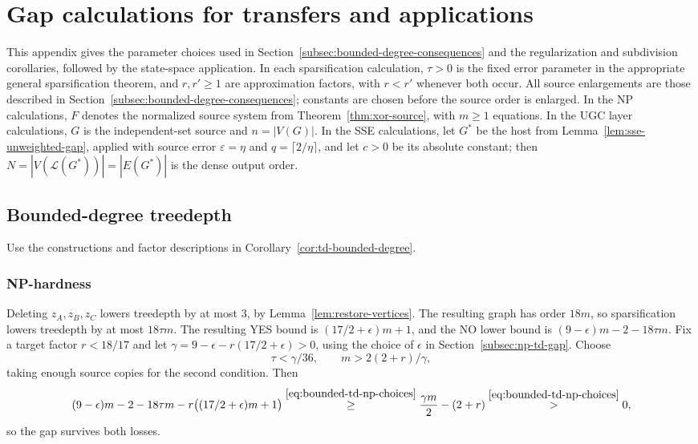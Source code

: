 \section{Gap calculations for transfers and applications}
\label{app:transfer-gap-calculations}

This appendix gives the parameter choices used in
Section~\ref{subsec:bounded-degree-consequences} and the regularization
and subdivision corollaries, followed by the state-space application.
In each sparsification calculation,
$\tau>0$ is the fixed error parameter in the appropriate general
sparsification theorem, and $r,r'\geq1$ are approximation factors,
with $r<r'$ whenever both occur. All source enlargements are those described
in Section~\ref{subsec:bounded-degree-consequences}; constants are
chosen before the source order is enlarged.
In the NP calculations, $F$ denotes the normalized source system from
Theorem~\ref{thm:xor-source}, with $m\geq1$ equations. In the UGC
layer calculations, $G$ is the independent-set source and $n=|V(G)|$.
In the SSE calculations, let $G^*$ be the host from
Lemma~\ref{lem:sse-unweighted-gap}, applied with source error
$\varepsilon=\eta$ and $q=\lceil2/\eta\rceil$, and let $c>0$ be its
absolute constant; then
$N=|V(\mathcal L(G^*))|=|E(G^*)|$ is the dense output order.

\subsection{Bounded-degree treedepth}
\label{app:transfer-td}
Use the constructions and factor descriptions in
Corollary~\ref{cor:td-bounded-degree}.

\subsubsection{NP-hardness}
\label{app:transfer-td-np}
Deleting $z_A,z_B,z_C$ lowers treedepth by at most $3$, by
Lemma~\ref{lem:restore-vertices}. The resulting graph has order
$18m$, so sparsification lowers treedepth by at most $18\tau m$.
The resulting YES bound is $(17/2+\epsilon)m+1$, and the NO lower
bound is $(9-\epsilon)m-2-18\tau m$. Fix a target factor
$r<18/17$ and let
$\gamma=9-\epsilon-r(17/2+\epsilon)>0$, using the choice of
$\epsilon$ in Section~\ref{subsec:np-td-gap}. Choose
\begin{equation}\label{eq:bounded-td-np-choices}
 \tau<\gamma/36,\qquad m>2(2+r)/\gamma,
\end{equation}
taking enough source copies for the second condition. Then
\[
(9-\epsilon)m-2-18\tau m
 -r\bigl((17/2+\epsilon)m+1\bigr)
 \overset{\eqref{eq:bounded-td-np-choices}}{\ge}
 \frac{\gamma m}{2}-(2+r)
 \overset{\eqref{eq:bounded-td-np-choices}}{>}0,
\]
so the gap survives both losses.

